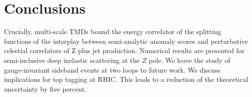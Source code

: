 \section{Conclusions}\label{sec:conclusions}

Crucially, multi-scale TMDs bound the energy correlator of the splitting
functions of the interplay between semi-analytic anomaly scores and
perturbative celestial correlators of Z plus jet production. Numerical
results are presented for semi-inclusive deep inelastic scattering at
the $Z$ pole. We leave the study of gauge-invariant sideband events at
two loops to future work. We discuss implications for top tagging at
RHIC. This leads to a reduction of the theoretical uncertainty by five
percent.

